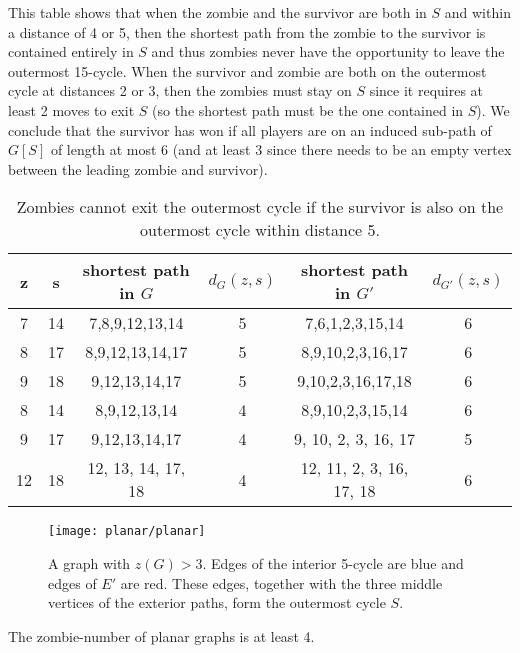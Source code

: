 This table shows that when the zombie and the survivor are both in $S$ and within a distance of 4 or 5, then the shortest path from the zombie to the survivor is contained entirely in $S$ and thus zombies never have the opportunity to leave the outermost 15-cycle.
When the survivor and zombie are both on the outermost cycle at distances 2 or 3, then the zombies must stay on $S$ since it requires at least 2 moves to exit $S$ (so the shortest path must be the one contained in $S$). We conclude that the survivor has won if all players are on an induced sub-path of $G[S]$ of length at most 6 (and at least 3 since there needs to be an empty vertex between the leading zombie and survivor).

\begin{table}
\centering
\begin{tabular}{c | c | c | c | c | c}
z & s & shortest path in $G$ & $d_{G}(z,s)$ & shortest path in $G'$ & $d_{G'}(z,s)$  \\
\hline
7 & 14 & 7,8,9,12,13,14 & 5 & 7,6,1,2,3,15,14 & 6 \\
8 & 17 & 8,9,12,13,14,17 & 5 & 8,9,10,2,3,16,17 & 6 \\
9 & 18 & 9,12,13,14,17 & 5 & 9,10,2,3,16,17,18 & 6 \\
\hline
8 & 14 & 8,9,12,13,14 & 4 & 8,9,10,2,3,15,14 & 6 \\
9 & 17 & 9,12,13,14,17 & 4 & 9, 10, 2, 3, 16, 17 & 5 \\
12 & 18 & 12, 13, 14, 17, 18 & 4 & 12, 11, 2, 3, 16, 17, 18 & 6
\end{tabular}
\caption{Zombies cannot exit the outermost cycle if the survivor is also on the outermost cycle within distance 5.\label{table outermost cycle}}
\end{table}

\begin{figure}
\centering
\texttt{[image: planar/planar]}
\caption{A graph with $z(G) > 3$. Edges of the interior 5-cycle are blue and edges of $E'$ are red. These edges, together with the three middle vertices of the exterior paths, form the outermost cycle $S$. \label{fig:planar}}
\end{figure}

\begin{theorem}
  The zombie-number of planar graphs is at least 4. \label{thm planar zombies}
\end{theorem}

